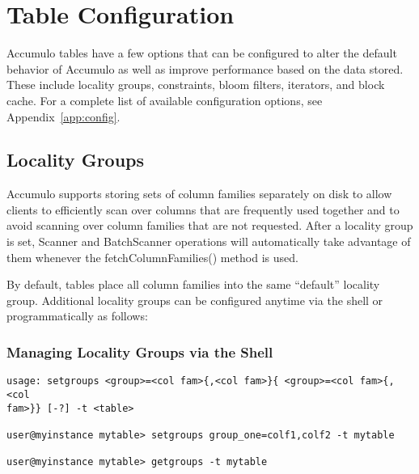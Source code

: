 
%
%

\chapter{Table Configuration}

Accumulo tables have a few options that can be configured to alter the default
behavior of Accumulo as well as improve performance based on the data stored.
These include locality groups, constraints, bloom filters, iterators, and block
cache. For a complete list of available configuration options, see
Appendix~\ref{app:config}.

\section{Locality Groups}
Accumulo supports storing sets of column families separately on disk to allow
clients to efficiently scan over columns that are frequently used together and to avoid
scanning over column families that are not requested. After a locality group is set,
Scanner and BatchScanner operations will automatically take advantage of them
whenever the fetchColumnFamilies() method is used.

By default, tables place all column families into the same ``default'' locality group.
Additional locality groups can be configured anytime via the shell or
programmatically as follows:

\subsection{Managing Locality Groups via the Shell}

\begingroup\fontsize{8pt}{8pt}\selectfont\begin{verbatim}
usage: setgroups <group>=<col fam>{,<col fam>}{ <group>=<col fam>{,<col
fam>}} [-?] -t <table>

user@myinstance mytable> setgroups group_one=colf1,colf2 -t mytable

user@myinstance mytable> getgroups -t mytable
\end{verbatim}\endgroup

